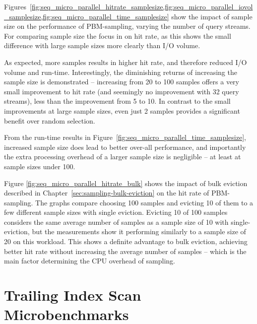 Figures~\cref{fig:seq_micro_parallel_hitrate_samplesize,fig:seq_micro_parallel_iovol_samplesize,fig:seq_micro_parallel_time_samplesize} show the impact of sample size on the performance of PBM-sampling, varying the number of query streams. For comparing sample size the focus in on hit rate, as this shows the small difference with large sample sizes more clearly than I/O volume.

As expected, more samples results in higher hit rate, and therefore reduced I/O volume and run-time. Interestingly, the diminishing returns of increasing the sample size is demonstrated -- increasing from 20 to 100 samples offers a very small improvement to hit rate (and seemingly no improvement with 32 query streams), less than the improvement from 5 to 10. In contrast to the small improvements at large sample sizes, even just 2 samples provides a significant benefit over random selection.

From the run-time results in Figure~\ref{fig:seq_micro_parallel_time_samplesize}, increased sample size does lead to better over-all performance, and importantly the extra processing overhead of a larger sample size is negligible -- at least at sample sizes under 100.

Figure \ref{fig:seq_micro_parallel_hitrate_bulk} shows the impact of bulk eviction described in Chapter~\ref{sec:sampling-bulk-eviction} on the hit rate of PBM-sampling. The graphs compare choosing 100 samples and evicting 10 of them to a few different sample sizes with single eviction. Evicting 10 of 100 samples considers the same average number of samples as a sample size of 10 with single-eviction, but the measurements show it performing similarly to a sample size of 20 on this workload. This shows a definite advantage to bulk eviction, achieving better hit rate without increasing the average number of samples -- which is the main factor determining the CPU overhead of sampling.



\section{Trailing Index Scan Microbenchmarks}

